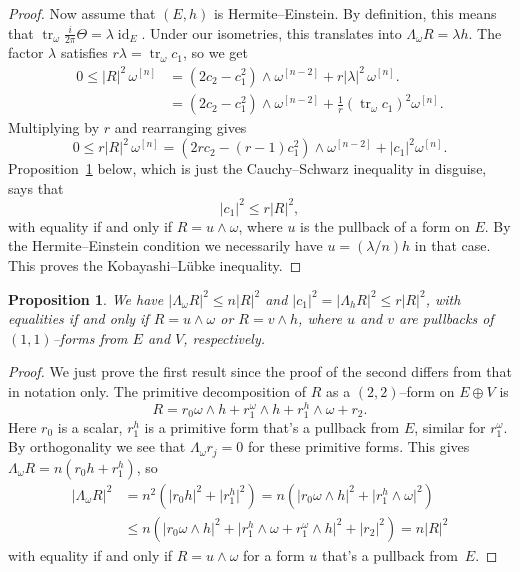 \documentclass[11pt,a4paper]{amsart}
\def\^#1{^{[#1]}}
\DeclareMathOperator{\tr}{tr}
\DeclareMathOperator{\id}{id}
\def\curv{\frac{i}{2\pi} \Theta}
\theoremstyle{slthm}
\newtheorem{prop}[theo]{Proposition}
\theoremstyle{sldef}
\theoremstyle{slrem}
\numberwithin{equation}{section}
\begin{document}
\begin{proof}
Now assume that $(E,h)$ is Hermite--Einstein. By definition, this means
that $\tr_\omega \curv = \lambda \id_{E}$. Under our isometries, this
translates into $\Lambda_\omega R = \lambda h$. The factor $\lambda$
satisfies $r \lambda = \tr_\omega c_1$, so we get
\begin{align*}
    0 \leq 
    \lvert R \rvert^2 \, \omega\^{n}
    &= (2 c_2 - c_1^2) \wedge \omega\^{n-2}
    + r |\lambda|^2 \, \omega\^{n}.
    \\
    &= (2 c_2 - c_1^2) \wedge \omega\^{n-2}
    + \tfrac 1r (\tr_\omega c_1)^2 \omega\^{n}.
\end{align*}
Multiplying by $r$ and rearranging gives 
$$
0 \leq
r \lvert R \rvert^2 \, \omega\^{n}
= (2r c_2 - (r-1)c_1^2) \wedge \omega\^{n-2}
+ \lvert c_1 \rvert^2 \omega\^{n}.
$$
Proposition~\ref{prop:CS} below, which is just the Cauchy--Schwarz
inequality in disguise, says that
$$
\lvert c_1 \rvert^2 \leq r \lvert R \rvert^2,
$$
with equality if and only if $R = u \wedge \omega$, where $u$ is the
pullback of a form on $E$. By the Hermite--Einstein condition we
necessarily have $u = (\lambda/n) h$ in that case. This proves the
Kobayashi--L\"{u}bke inequality.
\end{proof}



\begin{prop}
\label{prop:CS}
We have $\lvert \Lambda_\omega R\rvert^2 \leq n \lvert R \rvert^2$ and
$\lvert c_1 \rvert^2 = \lvert \Lambda_h R\rvert^2 \leq r \lvert R
\rvert^2$, with equalities if and only if $R = u \wedge \omega$ or $R = v
\wedge h$, where $u$ and $v$ are pullbacks of $(1,1)$--forms from $E$ and
$V$, respectively. 
\end{prop}

\begin{proof}
    We just prove the first result since the proof of the second
differs from that in notation only.  The primitive decomposition of
$R$ as a $(2,2)$--form on $E \oplus V$ is 
$$
R = r_0 \omega \wedge h + r_1^\omega \wedge h + r_1^h \wedge \omega
+ r_2.
$$
Here $r_0$ is a scalar, $r_1^h$ is a primitive form that's a pullback from
$E$, similar for $r_1^\omega$. By orthogonality we see that $\Lambda_\omega
r_j = 0$ for these primitive forms. This gives 
$\Lambda_\omega R = n (r_0 h + r_1^h)$,
so
\begin{align*}
\lvert \Lambda_\omega R \rvert^2 
&= n^2 (\lvert r_0 h\rvert^2 +\lvert r_1^h\rvert^2)
= n (\lvert r_0 \omega \wedge h\rvert^2 
+ \lvert r_1^h \wedge \omega \rvert^2)
\\
&\leq
n(\lvert r_0 \omega \wedge h \rvert^2 
+ \lvert r_1^h \wedge \omega 
+ r_1^\omega \wedge h \rvert^2 
+ \lvert r_2 \rvert^2 )
= n \lvert R \rvert^2
\end{align*}
with equality if and only if $R = u \wedge \omega$ for a form $u$
that's a pullback from~$E$.%
\end{proof}
\end{document}
